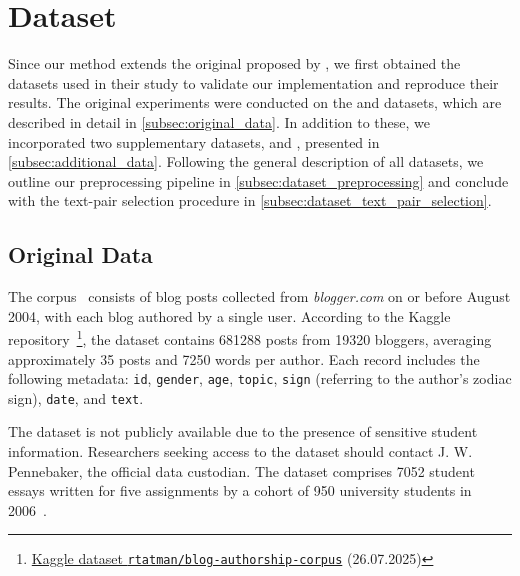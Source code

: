 \section{Dataset}
\label{sec:dataset}

Since our method extends the original \impAppr{} proposed by \citet{koppel_determining_2014}, we first obtained the datasets used in their study to validate our implementation and reproduce their results. 
The original experiments were conducted on the \dataBlog{} and \dataStudent{} datasets, which are described in detail in \autoref{subsec:original_data}. 
In addition to these, we incorporated two supplementary datasets, \dataPan{} and \dataGutenberg{}, presented in \autoref{subsec:additional_data}. 
Following the general description of all datasets, we outline our preprocessing pipeline in \autoref{subsec:dataset_preprocessing} and conclude with the text-pair selection procedure in \autoref{subsec:dataset_text_pair_selection}.


\subsection{Original Data}
\label{subsec:original_data}

The \dataBlog{} corpus~\citep{blog_dataset_2006} consists of blog posts collected from \textit{blogger.com} on or before August 2004, with each blog authored by a single user.
According to the Kaggle repository~\footnote{\href{https://www.kaggle.com/datasets/rtatman/blog-authorship-corpus?resource=download}{Kaggle dataset \texttt{rtatman/blog-authorship-corpus}} (26.07.2025)}, the dataset contains \num{681288} posts from \num{19320} bloggers, averaging approximately 35 posts and \num{7250} words per author.
Each record includes the following metadata: \texttt{id}, \texttt{gender}, \texttt{age}, \texttt{topic}, 
\texttt{sign} (referring to the author's zodiac sign), \texttt{date}, and \texttt{text}.

The \dataStudent{} dataset is not publicly available due to the presence of sensitive student information. 
Researchers seeking access to the \dataStudent{} dataset should contact J. W. Pennebaker, the official data custodian. 
The dataset comprises \num{7052} student essays written for five assignments by a cohort of 950 university students in 2006~\citep{koppel_determining_2014}.

